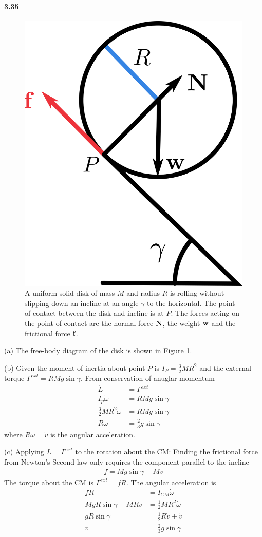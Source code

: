 \documentclass[../problems.tex]{subfiles}
\begin{document}
\paragraph{3.35}
\begin{figure}[ht]
    \centering
    \includegraphics[width=0.3\linewidth]{../images/fig3_35.png}
    \captionsetup{width=0.7\linewidth}
    \caption{A uniform solid disk of mass $M$ and radius $R$ is rolling without slipping down an
    incline at an angle $\gamma$ to the horizontal. The point of contact between the disk and
    incline is at $P$. The forces acting on the point of contact are the normal force $\vb{N}$, the 
    weight $\vb{w}$ and the frictional force $\vb{f}$.}
    \label{fig:3_35}
\end{figure}
(a) The free-body diagram of the disk is shown in Figure \ref{fig:3_35}.

(b) Given the moment of inertia about point $P$ is $I_P = \frac{3}{2} MR^2$ and the external torque
$\Gamma^{ext} = R Mg \sin{\gamma}$. From conservation of anuglar momentum
\begin{align*}
    \dot{L} &= \Gamma^{ext} \\
    I_p \dot \omega &= RMg \sin{\gamma} \\
    \frac{3}{2} MR^2 \dot \omega &= RMg \sin{\gamma} \\
    R \dot \omega &= \frac{2}{3} g\sin{\gamma}
\end{align*}
where $R\dot{\omega} = \dot{v}$ is the angular acceleration.

(c) Applying $\dot{L} = \Gamma^{ext}$ to the rotation about the CM: Finding the frictional force
from Newton's Second law only requires the component parallel to the incline
\begin{align*}
    f = Mg \sin{\gamma} - M\dot{v}
\end{align*}
The torque about the CM is $\Gamma^{ext} = fR$. The angular acceleration is
\begin{align*}
    fR &= I_{CM} \dot{\omega} \\
    MgR\sin{\gamma} - MR\dot{v} &= \frac{1}{2} MR^2 \dot{\omega} \\
    gR \sin{\gamma} &= \frac{1}{2} R \dot{v} + \dot{v} \\
    \dot{v} &= \frac{2}{3} g \sin{\gamma}
\end{align*}
\end{document}
